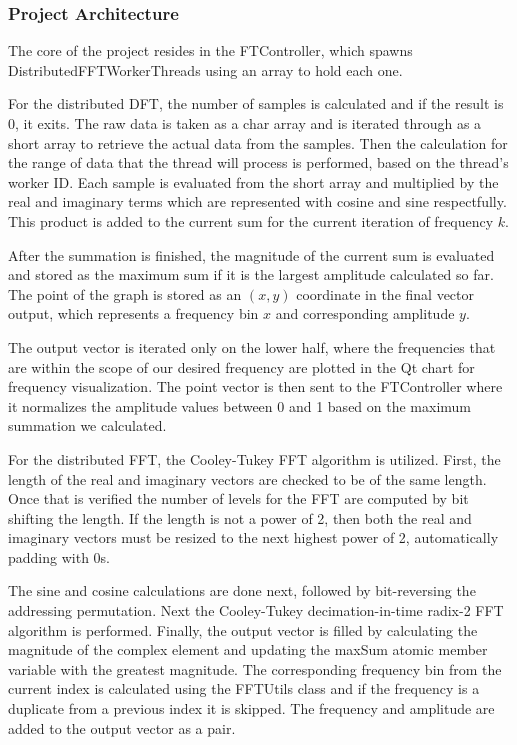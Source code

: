 \documentclass[journal]{IEEEtran}
\begin{document}
\subsubsection{Project Architecture}
    \par{
		The core of the project resides in the FTController, which spawns DistributedFFTWorkerThreads using an array to hold each one.
	}
    \par{
		For the distributed DFT, the number of samples is calculated and if the result is 0, it exits. 
		The raw data is taken as a char array and is iterated through as a short array to retrieve the actual
		data from the samples. Then the calculation 
		for the range of data that the thread will process is performed, based on the thread's worker ID. 
		Each sample is evaluated from the 
		short array and multiplied by the real and imaginary terms which are represented with cosine and sine 
		respectfully. This product is added to the current sum for the current iteration of frequency $k$.
	}
    \par{
		After the summation is finished, the magnitude of the current sum is evaluated and stored as the maximum sum if it is the largest amplitude calculated so far. 
		The point of the graph is stored as an $(x,y)$ coordinate in the final vector output, which represents a
		frequency bin $x$ and corresponding amplitude $y$.
	}
    \par{
		The output vector is iterated only on the lower half, where the frequencies that are within the scope 
		of our desired frequency are plotted in the Qt chart for frequency visualization. The point vector is then
		sent to the FTController where it normalizes the amplitude values
		between 0 and 1 based on the maximum summation we calculated.
	}
    \par{
		For the distributed FFT, the Cooley-Tukey FFT algorithm is utilized. First, the length of the real and imaginary 
		vectors are checked to be of the same length. Once that is verified the number of levels for the FFT are 
		computed by bit shifting the length. If the length is not a power of 2, then both the real and imaginary 
		vectors must be resized to the next highest power of 2, automatically padding
		with 0s. 
	}
    \par{
		The sine and cosine calculations are done next, followed by bit-reversing the addressing permutation. 
		Next the Cooley-Tukey decimation-in-time radix-2 FFT algorithm is performed. Finally, the output vector is 
		filled by calculating the magnitude of the complex element and updating the maxSum atomic member 
		variable with the greatest magnitude.  The corresponding frequency bin from the current 
		index is calculated using the FFTUtils class and if the frequency is a duplicate from a previous index 
		it is skipped. The frequency and amplitude are added to the output vector as a pair.
	}
\end{document}
